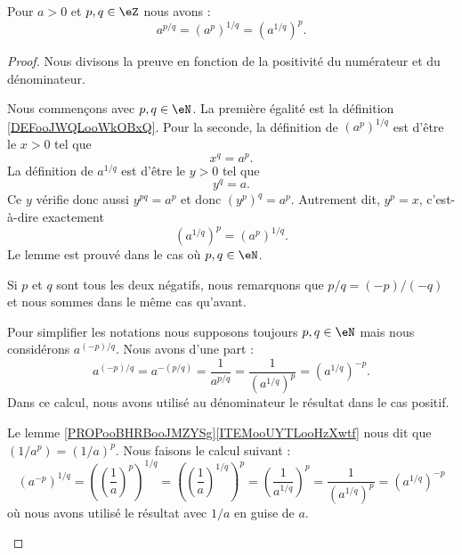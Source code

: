 \begin{lemma}        \label{LEMooIDLJooZALNaD}
	Pour \( a>0\) et \( p,q\in \eZ\) nous avons :
	\begin{equation}
		a^{p/q}=(a^p)^{1/q}=(a^{1/q})^p.
	\end{equation}
\end{lemma}

\begin{proof}
	Nous divisons la preuve en fonction de la positivité du numérateur et du dénominateur.
	\begin{subproof}

		Nous commençons avec \( p,q\in \eN\). La première égalité est la définition \ref{DEFooJWQLooWkOBxQ}. Pour la seconde, la définition de \( (a^p)^{1/q}\) est d'être le \( x>0\) tel que
		\begin{equation}
			x^q=a^p.
		\end{equation}
		La définition de \( a^{1/q}\) est d'être le \( y>0\) tel que
		\begin{equation}
			y^q=a.
		\end{equation}
		Ce \( y\) vérifie donc aussi \( y^{pq}=a^p\) et donc \( (y^p)^q=a^p\). Autrement dit, \( y^p=x\), c'est-à-dire exactement
		\begin{equation}
			(a^{1/q})^p=(a^p)^{1/q}.
		\end{equation}
		Le lemme est prouvé dans le cas où \( p,q\in \eN\).


		Si \( p\) et \( q\) sont tous les deux négatifs, nous remarquons que \( p/q=(-p)/(-q)\) et nous sommes dans le même cas qu'avant.


		Pour simplifier les notations nous supposons toujours \( p,q\in \eN\) mais nous considérons \( a^{(-p)/q}\). Nous avons d'une part :
		\begin{equation}
			a^{(-p)/q}=a^{-(p/q)}=\frac{1}{ a^{p/q} }=\frac{1}{ (a^{1/q})^p }=(a^{1/q})^{-p}.
		\end{equation}
		Dans ce calcul, nous avons utilisé au dénominateur le résultat dans le cas positif.

		Le lemme \ref{PROPooBHRBooJMZYSg}\ref{ITEMooUYTLooHzXwtf} nous dit que \( (1/a^p)=(1/a)^p\). Nous faisons le calcul suivant :
		\begin{equation}
			(a^{-p})^{1/q}=\left( \left( \frac{1}{ a } \right)^p \right)^{1/q}=\left( \left( \frac{1}{ a } \right)^{1/q} \right)^p=\left( \frac{1}{ a^{1/q} } \right)^p=\frac{1}{ (a^{1/q})^p }=(a^{1/q})^{-p}
		\end{equation}
		où nous avons utilisé le résultat avec \( 1/a\) en guise de \( a\).


\end{subproof}
\end{proof}

